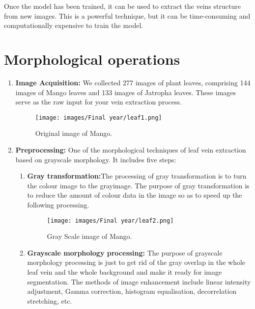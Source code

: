 \documentclass{report}
\begin{document}
{Once the model has been trained, it can be used to extract the veins structure from new images. This is a powerful technique, but it can be time-consuming and computationally expensive to train the model.
\section{Morphological operations}
\begin{enumerate}
    \item \textbf{Image Acquisition: }We collected 277 images of plant leaves, comprising 144 images of Mango leaves and 133 images of Jatropha leaves. These images serve as the raw input for your vein extraction process.
    \vspace{1cm}
    \begin{figure}[htbp]
        \centering
        \texttt{[image: images/Final year/leaf1.png]} %
        \caption{Original image of Mango.}
    \end{figure}
    \vspace{6cm}
    \item \textbf{Preprocessing: }One of the morphological techniques of leaf vein extraction based on grayscale morphology. It includes five steps:
    \begin{enumerate}
        \item \textbf{Gray transformation:}The processing of gray transformation is to turn the colour image to the grayimage. The purpose of gray transformation is to reduce the amount of colour data in the image so as to speed up the following processing.
        \vspace{1cm}
        \begin{figure}[htbp]
            \centering
            \texttt{[image: images/Final year/leaf2.png]} %
            \caption{Gray Scale image of Mango.}
        \end{figure}
        \vspace{6cm}
        \item \textbf{Grayscale morphology processing: }The purpose of grayscale morphology processing is just to get rid of the gray overlap in the whole leaf vein and the whole background and make it ready for image segmentation. The methods of image enhancement include linear intensity adjustment, Gamma correction, histogram equalisation, decorrelation stretching, etc.
        \\ \\

\end{enumerate}
\end{enumerate}}
\end{document}

